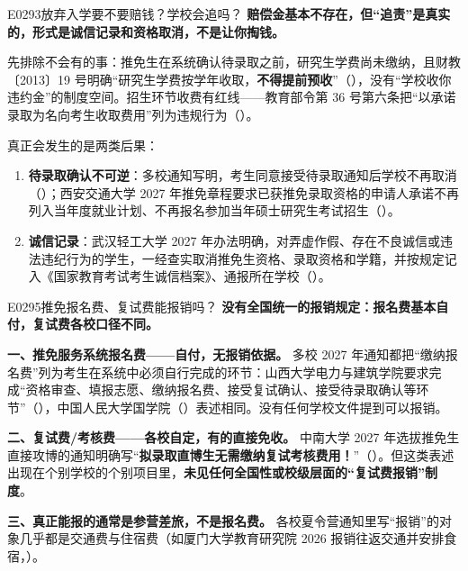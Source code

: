 \begin{qa}{E0293}{放弃入学要不要赔钱？学校会追吗？}
\textbf{赔偿金基本不存在，但“追责”是真实的，形式是诚信记录和资格取消，不是让你掏钱。}

先排除不会有的事：推免生在系统确认待录取之前，研究生学费尚未缴纳，且财教〔2013〕19 号明确“研究生学费按学年收取，\textbf{不得提前预收}”（），没有“学校收你违约金”的制度空间。招生环节收费有红线——教育部令第 36 号第六条把“以承诺录取为名向考生收取费用”列为违规行为（）。

真正会发生的是两类后果：

\begin{enumerate}
  \item \textbf{待录取确认不可逆}：多校通知写明，考生同意接受待录取通知后学校不再取消（）；西安交通大学 2027 年推免章程要求已获推免录取资格的申请人承诺不再列入当年度就业计划、不再报名参加当年硕士研究生考试招生（）。
  \item \textbf{诚信记录}：武汉轻工大学 2027 年办法明确，对弄虚作假、存在不良诚信或违法违纪行为的学生，一经查实取消推免生资格、录取资格和学籍，并按规定记入《国家教育考试考生诚信档案》、通报所在学校（）。
\end{enumerate}
\end{qa}

\begin{qa}{E0295}{推免报名费、复试费能报销吗？}
\textbf{没有全国统一的报销规定：报名费基本自付，复试费各校口径不同。}

\textbf{一、推免服务系统报名费——自付，无报销依据。} 多校 2027 年通知都把“缴纳报名费”列为考生在系统中必须自行完成的环节：山西大学电力与建筑学院要求完成“资格审查、填报志愿、缴纳报名费、接受复试确认、接受待录取确认等环节”（），中国人民大学国学院（）表述相同。没有任何学校文件提到可以报销。

\textbf{二、复试费/考核费——各校自定，有的直接免收。} 中南大学 2027 年选拔推免生直接攻博的通知明确写“\textbf{拟录取直博生无需缴纳复试考核费用！}”（）。但这类表述出现在个别学校的个别项目里，\textbf{未见任何全国性或校级层面的“复试费报销”制度}。

\textbf{三、真正能报的通常是参营差旅，不是报名费。} 各校夏令营通知里写“报销”的对象几乎都是交通费与住宿费（如厦门大学教育研究院 2026 报销往返交通并安排食宿，）。
\end{qa}

